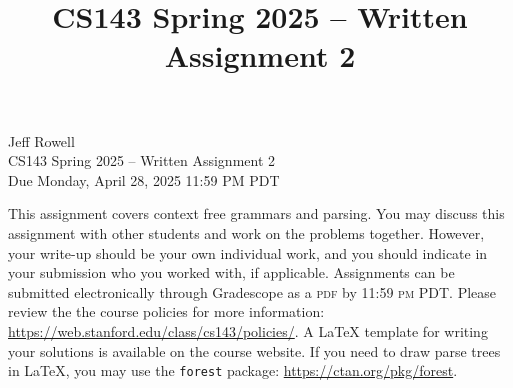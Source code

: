 \documentclass[11pt]{article}
\title{CS143 Spring 2025 -- Written Assignment 2}
\begin{document}
\begin{center}
\LARGE Jeff Rowell \\
\LARGE CS143 Spring 2025 -- Written Assignment 2 \\
\large Due Monday, April 28, 2025 11:59 PM PDT
\end{center}

This assignment covers context free grammars and parsing. You may discuss this assignment with other students and work on the problems together. However, your write-up should be your own individual work, and you should indicate in your submission who you worked with, if applicable. Assignments can be submitted electronically through Gradescope as a \textsc{pdf} by 11:59 \textsc{pm PDT}. Please review the the course policies for more information: \url{https://web.stanford.edu/class/cs143/policies/}. A \LaTeX{} template for writing your solutions is available on the course website.
If you need to draw parse trees in \LaTeX{}, you may use the {\tt forest} package: \url{https://ctan.org/pkg/forest}.

\bigskip
\end{document}

